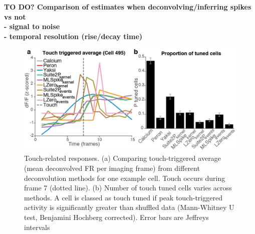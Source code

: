 \documentclass[a4paper,10pt,twocolumn]{article}
\begin{document}
\textbf{TO DO? Comparison of estimates when deconvolving/inferring spikes vs not\\
\indent - signal to noise \\
\indent - temporal resolution (rise/decay time)}\\



\begin{figure}
\includegraphics[width=\textwidth]{full_figs/why_deconvolve_F6_3.png} 
\caption{\label{fig:touch_triggered} Touch-related responses. (a) Comparing touch-triggered average (mean deconvolved FR per imaging frame) from different deconvolution methods for one example cell. Touch occurs during frame 7 (dotted line). (b) Number of touch tuned cells varies across methods. A cell is classed as touch tuned if peak touch-triggered activity is significantly greater than shuffled data (Mann-Whitney U test, Benjamini Hochberg corrected). Error bars are Jeffreys intervals}
\end{figure}






%
\end{document}
